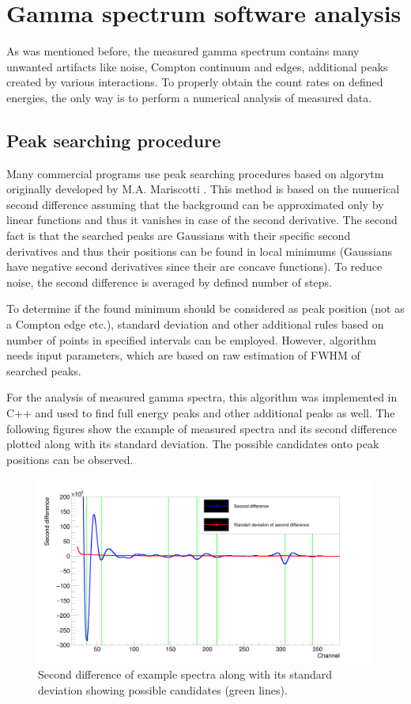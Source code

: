\chapter{Gamma spectrum software analysis}
As was mentioned before, the measured gamma spectrum contains many unwanted artifacts like noise, Compton continuum and edges, additional peaks created by various interactions. To properly obtain the count rates on defined energies, the only way is to perform a numerical analysis of measured data.


\section{Peak searching procedure}
Many commercial programs use peak searching procedures based on algorytm originally developed by M.A. Mariscotti \cite{MARISCOTTI1967309}. This method is based on the numerical second difference assuming that the background can be approximated only by linear functions and thus it vanishes in case of the second derivative. The second fact is that the searched peaks are Gaussians with their specific second derivatives and thus their positions can be found in local minimums (Gaussians have negative second derivatives since their are concave functions). To reduce noise, the second difference is averaged by defined number of steps.
\par
To determine if the found minimum should be considered as peak position (not as a Compton edge etc.), standard deviation and other additional rules based on number of points in specified intervals can be employed. However, algorithm needs input parameters, which are based on raw estimation of FWHM of searched peaks.
\par
For the analysis of measured gamma spectra, this algorithm was implemented in C++ and used to find full energy peaks and other additional peaks as well. The following figures show the example of measured spectra and its second difference plotted along with its standard deviation. The possible candidates onto peak positions can be observed.
\par


\begin{figure}[H]
 \centering
 \includegraphics[scale=0.105, angle = 0]{./pictures/SecondDerivGraph.png}
 \caption{Second difference of example spectra along with its standard deviation showing possible candidates (green lines).}
 \label{secondDerivative}
 
\end{figure}

